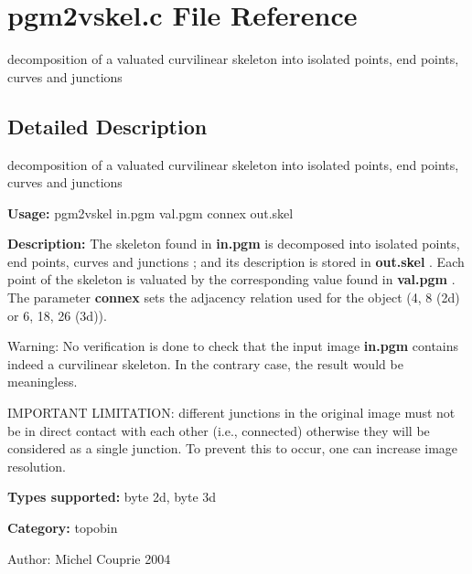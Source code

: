 \section{pgm2vskel.c File Reference}
\label{pgm2vskel_8c}
decomposition of a valuated curvilinear skeleton into isolated points, end points, curves and junctions  




\label{_details}
\subsection{Detailed Description}
decomposition of a valuated curvilinear skeleton into isolated points, end points, curves and junctions 

{\bf Usage:} pgm2vskel in.pgm val.pgm connex out.skel

{\bf Description:} The skeleton found in {\bf in.pgm} is decomposed into isolated points, end points, curves and junctions ; and its description is stored in {\bf out.skel} . Each point of the skeleton is valuated by the corresponding value found in {\bf val.pgm} . The parameter {\bf connex} sets the adjacency relation used for the object (4, 8 (2d) or 6, 18, 26 (3d)).

\begin{Desc}
\item[Warning:]No verification is done to check that the input image {\bf in.pgm} contains indeed a curvilinear skeleton. In the contrary case, the result would be meaningless.

IMPORTANT LIMITATION: different junctions in the original image must not be in direct contact with each other (i.e., connected) otherwise they will be considered as a single junction. To prevent this to occur, one can increase image resolution.\end{Desc}
{\bf Types supported:} byte 2d, byte 3d

{\bf Category:} topobin

\begin{Desc}
\item[Author:]Michel Couprie 2004 \end{Desc}
